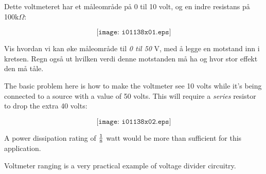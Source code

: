 

Dette voltmeteret har et måleområde på 0 til 10 volt, og en indre resistans på 100k$\Omega$:

$$\texttt{[image: i01138x01.eps]}$$

Vis hvordan vi kan øke måleområde til \textit{0 til 50} V, med å legge en motstand inn i kretsen. Regn også ut hvilken verdi denne motstanden  må ha og hvor stor effekt den må tåle. 







The basic problem here is how to make the voltmeter see 10 volts while it's being connected to a source with a value of 50 volts.  This will require a {\it series} resistor to drop the extra 40 volts:

$$\texttt{[image: i01138x02.eps]}$$

A power dissipation rating of ${1 \over 8}$ watt would be more than sufficient for this application.







Voltmeter ranging is a very practical example of voltage divider circuitry.




